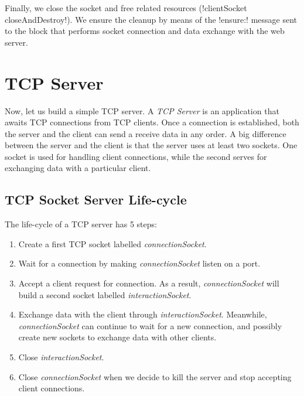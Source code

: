 \documentclass[a4paper,10pt,twoside]{book}
\begin{document}
Finally, we  close the socket and free related resources (\ct!clientSocket closeAndDestroy!).
We ensure the cleanup by means of the \ct!ensure:! message sent to the block that performs socket connection and data exchange with the web server.

\section{TCP Server}
\label{sec:serverTcpSocket}
Now, let us build a simple TCP server. A \textit{TCP Server} is an application that awaits TCP connections from TCP clients. Once a connection is established, both the server and the client can send a receive data in any order. 
A big difference between the server and the client is that the server uses at least two sockets.
One socket is used for handling client connections, while the second serves for exchanging data with a particular client. 


\subsection{TCP Socket Server Life-cycle}
The life-cycle of a TCP server has 5 steps:
\begin{enumerate}
\item Create a first TCP socket labelled \textit{connectionSocket}.
\item Wait for a connection by making \textit{connectionSocket} listen on a port.
\item Accept a client request for connection. As a result, \textit{connectionSocket} will build a second socket labelled \textit{interactionSocket}.
\item Exchange data with the client through \textit{interactionSocket}. Meanwhile, \textit{connectionSocket} can continue to wait for a new connection, and possibly create new sockets to exchange data with other clients. 
\item Close \textit{interactionSocket}.
\item Close \textit{connectionSocket} when we decide to kill the server and stop accepting client connections.
\end{enumerate}
\end{document}
